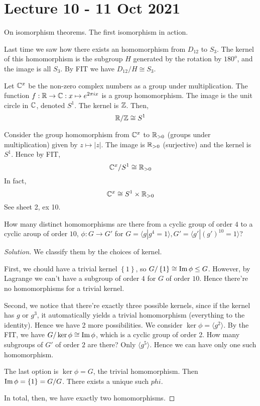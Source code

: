 \section{Lecture 10 - 11 Oct 2021}
On isomorphism theorems. The first isomorphism in action.

\begin{example}
  Last time we saw how there exists an homomorphism from $D_{12}$ to $S_3$. The kernel of
  this homomorphism is the subgroup $H$ generated by the rotation by $180^o$, and the
  image is all $S_3$. By FIT we have $D_{12}/H \cong S_3$.
\end{example}
\begin{example}
  Let $\mathbb C^x$ be the non-zero complex numbers as a group under multiplication. The
  function $f:\mathbb R\to\mathbb C:x\mapsto e^{2\pi i x}$ is a group homomorphism. The image is the
  unit circle in $\mathbb C$, denoted $S^1$. The kernel is $\mathbb Z$. Then,
  \[\mathbb R/\mathbb Z \cong S^1\]
\end{example}

\begin{example}
  Consider the group homomorphism from $\mathbb C^x$ to $\mathbb R_{>0}$ (groups under
  multiplication) given by $z\mapsto |z|$. The image is $\mathbb R_{>0}$ (surjective) and the kernel is
  $S^1$. Hence by FIT,
  \[\mathbb C^x / S^1 \cong \mathbb R_{>0}\]
  In fact,
  \[\mathbb C^x \cong S^1 \times \mathbb R_{>0}\]
  See sheet 2, ex 10.
\end{example}
\begin{example}
  How many distinct homomorphisms are there from a cyclic group of order $4$ to a cyclic
  aroup of order $10$, $\phi:G\to G'$ for $G=\langle g|g^4=1\rangle,G'=\langle
  g'|(g')^{10}=1\rangle$?  
\end{example}
\begin{proof}[Solution]
  We classify them by the choices of kernel. 

  First, we chould have a trivial kernel $\left\{ 1 \right\}$, so $G/\left\{ 1 \right\}
  \cong \operatorname{Im}\phi \leq G$. However, by Lagrange we can't have a subgroup of order $4$ for
  $G$ of order $10$. Hence there're no homomorphisms for a trivial kernel.

  Second, we notice that there're exactly three possible kernels, since if the kernel has
  $g$ or $g^3$, it automatically yields a trivial homomorphism (everything to the
  identity). Hence we have 2 more possibilities. We consider $\ker\phi=\langle
  g^2\rangle$. By the FIT, we have $G/\ker\phi \cong \operatorname{Im}\phi$, which is a cyclic group of
  order 2. How many subgroups of $G'$ of order $2$ are there? Only $\langle
  g^5\rangle$. Hence we can have only one such homomorphism.

  The last option is $\ker\phi=G$, the trivial homomorphism. Then $\operatorname{Im}\phi=\left\{ 1
  \right\}= G/G$. There exists a unique such $phi$. 

  In total, then, we have exactly two homomorphisms.
\end{proof}

